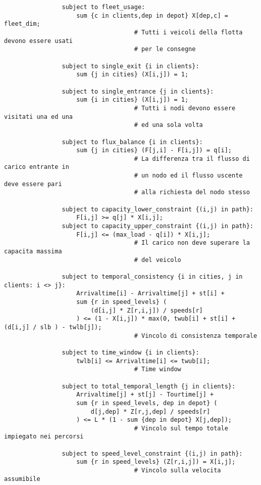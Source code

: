 			\begin{verbatim}				
				subject to fleet_usage:
					sum {c in clients,dep in depot} X[dep,c] = fleet_dim;
									# Tutti i veicoli della flotta devono essere usati
									# per le consegne

				subject to single_exit {i in clients}:
					sum {j in cities} (X[i,j]) = 1; 
					
				subject to single_entrance {j in clients}:
					sum {i in cities} (X[i,j]) = 1;
									# Tutti i nodi devono essere visitati una ed una
									# ed una sola volta

				subject to flux_balance {i in clients}:
					sum {j in cities} (F[j,i] - F[i,j]) = q[i];
									# La differenza tra il flusso di carico entrante in 
									# un nodo ed il flusso uscente deve essere pari 
									# alla richiesta del nodo stesso

				subject to capacity_lower_constraint {(i,j) in path}:
					F[i,j] >= q[j] * X[i,j];
				subject to capacity_upper_constraint {(i,j) in path}:
					F[i,j] <= (max_load - q[i]) * X[i,j];
									# Il carico non deve superare la capacita massima
									# del veicolo

				subject to temporal_consistency {i in cities, j in clients: i <> j}:
					Arrivaltime[i] - Arrivaltime[j] + st[i] +
					sum {r in speed_levels} (
						(d[i,j] * Z[r,i,j]) / speeds[r]	
					) <= (1 - X[i,j]) * max(0, twub[i] + st[i] + (d[i,j] / slb ) - twlb[j]);
									# Vincolo di consistenza temporale
										
				subject to time_window {i in clients}:
					twlb[i] <= Arrivaltime[i] <= twub[i];
									# Time window

				subject to total_temporal_length {j in clients}:
					Arrivaltime[j] + st[j] - Tourtime[j] + 
					sum {r in speed_levels, dep in depot} (
						d[j,dep] * Z[r,j,dep] / speeds[r]
					) <= L * (1 - sum {dep in depot} X[j,dep]);
									# Vincolo sul tempo totale impiegato nei percorsi

				subject to speed_level_constraint {(i,j) in path}:
					sum {r in speed_levels} (Z[r,i,j]) = X[i,j];
									# Vincolo sulla velocita assumibile
			\end{verbatim}


	

